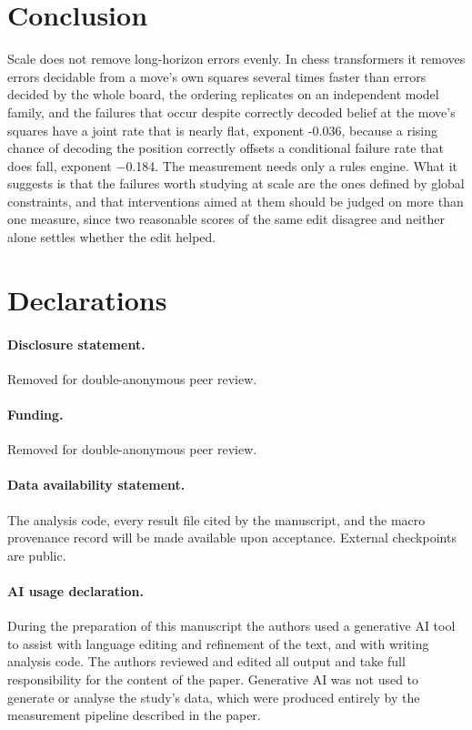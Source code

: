 \documentclass[11pt]{article}
\begin{document}
\section{Conclusion}

Scale does not remove long-horizon errors evenly. In chess transformers it removes
errors decidable from a move's own squares several times faster than errors
decided by the whole board, the ordering replicates on an independent model family,
and the failures that occur despite correctly decoded belief at the move's squares
have a joint rate that is nearly flat, exponent -0.036, because a rising chance
of decoding the position correctly offsets a conditional failure rate that does fall,
exponent $-$0.184. The measurement needs only a rules engine. What it suggests is
that the failures worth studying at scale are the ones defined by global constraints,
and that interventions aimed at them should be judged on more than one measure, since
two reasonable scores of the same edit disagree and neither alone settles whether the
edit helped.

\section*{Declarations}

\paragraph{Disclosure statement.}
 Removed for double-anonymous peer review.


\paragraph{Funding.}
 Removed for double-anonymous peer review.


\paragraph{Data availability statement.}

The analysis code, every result file cited by the manuscript, and the macro
provenance record will be made available upon acceptance. External checkpoints are
public.


\paragraph{AI usage declaration.}
During the preparation of this manuscript the authors used a generative AI tool to
assist with language editing and refinement of the text, and with writing analysis
code. The authors reviewed and edited all output and take full responsibility for
the content of the paper. Generative AI was not used to generate or analyse the
study's data, which were produced entirely by the measurement pipeline described in
the paper.
\end{document}
